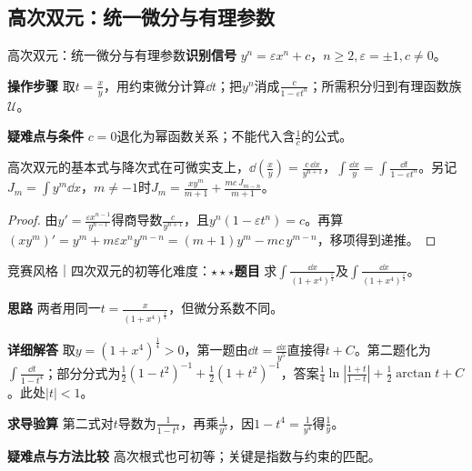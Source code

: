 \subsection{高次双元：统一微分与有理参数}\label{ic:indefinite_dual_complete:highdual}\begin{method}{高次双元：统一微分与有理参数}\textbf{识别信号} $y^n=\varepsilon x^n+c$，$n\ge2,\varepsilon=\pm1,c\ne0$。\par \textbf{操作步骤} 取$t=\frac{x}{y}$，用约束微分计算$\dd t$；把$y^n$消成$\frac{c}{1-\varepsilon t^n}$；所需积分归到有理函数族$\mathcal U$。\par \textbf{疑难点与条件} $c=0$退化为幂函数关系；不能代入含$\frac{1}{c}$的公式。\end{method}

\begin{theorem}{高次双元的基本式与降次式}在可微实支上，$\dd(\frac{x}{y})=\frac{c\,\dd x}{y^{n+1}}$，$\int\frac{\dd x}{y}=\int\frac{\dd t}{1-\varepsilon t^n}$。另记$J_m=\int y^m\dd x$，$m\ne-1$时$J_m=\frac{xy^m}{m+1}+\frac{mc\,J_{m-n}}{m+1}$。\end{theorem}\begin{proof}由$y'=\frac{\varepsilon x^{n-1}}{y^{n-1}}$得商导数$\frac{c}{y^{n+1}}$，且$y^n(1-\varepsilon t^n)=c$。再算$(xy^m)'=y^m+m\varepsilon x^ny^{m-n}=(m+1)y^m-mc\,y^{m-n}$，移项得到递推。\end{proof}

\begin{example}{竞赛风格｜四次双元的初等化}{难度：$\star\star\star$}\label{ic:ex:indefinite_dual_complete:fourthdual}\textbf{题目} 求$\int\frac{\dd x}{(1+x^4)^{\frac{5}{4}}}$及$\int\frac{\dd x}{(1+x^4)^{\frac{1}{4}}}$。\par \textbf{思路} 两者用同一$t=\frac{x}{(1+x^4)^{\frac{1}{4}}}$，但微分系数不同。\par \textbf{详细解答} 取$y=(1+x^4)^{\frac{1}{4}}>0$，第一题由$\dd t=\frac{\dd x}{y^5}$直接得$t+C$。第二题化为$\int\frac{\dd t}{1-t^4}$；部分分式为$\frac12(1-t^2)^{-1}+\frac12(1+t^2)^{-1}$，答案$\frac14\ln|\frac{1+t}{1-t}|+\frac12\arctan t+C$。此处$|t|<1$。\par \textbf{求导验算} 第二式对$t$导数为$\frac{1}{1-t^4}$，再乘$\frac{1}{y^5}$，因$1-t^4=\frac{1}{y^4}$得$\frac{1}{y}$。\par \textbf{疑难点与方法比较} 高次根式也可初等；关键是指数与约束的匹配。\end{example}

